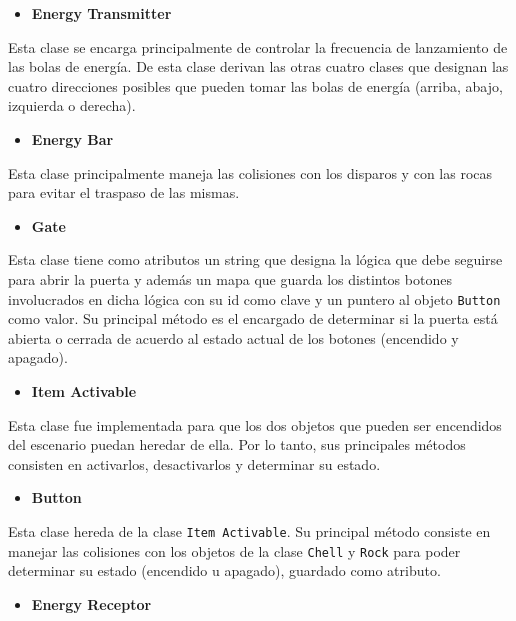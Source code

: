 \documentclass[a4paper]{article}
\begin{document}
\begin{itemize}
	\item \textbf{Energy Transmitter}
\end{itemize}

Esta clase se encarga principalmente de controlar la frecuencia de lanzamiento de las bolas de energía. De esta clase derivan las otras cuatro clases que designan las cuatro direcciones posibles que pueden tomar las bolas de energía (arriba, abajo, izquierda o derecha).

\begin{itemize}
	\item \textbf{Energy Bar}
\end{itemize}

Esta clase principalmente maneja las colisiones con los disparos y con las rocas para evitar el traspaso de las mismas.


\begin{itemize}
	\item \textbf{Gate}
\end{itemize}

Esta clase tiene como atributos un string que designa la lógica que debe seguirse para abrir la puerta y además un mapa que guarda los distintos botones involucrados en dicha lógica con su id como clave y un puntero al objeto \texttt{Button} como valor. Su principal método es el encargado de determinar si la puerta está abierta o cerrada de acuerdo al estado actual de los botones (encendido y apagado).

\begin{itemize}
	\item \textbf{Item Activable}
\end{itemize}

Esta clase fue implementada para que los dos objetos que pueden ser encendidos del escenario puedan heredar de ella. Por lo tanto, sus principales métodos consisten en activarlos, desactivarlos y determinar su estado.

\begin{itemize}
	\item \textbf{Button}
\end{itemize}

Esta clase hereda de la clase \texttt{Item Activable}. Su principal método consiste en manejar las colisiones con los objetos de la clase \texttt{Chell} y \texttt{Rock} para poder determinar su estado (encendido u apagado), guardado como atributo.

\begin{itemize}
	\item \textbf{Energy Receptor}
\end{itemize}
\end{document}
